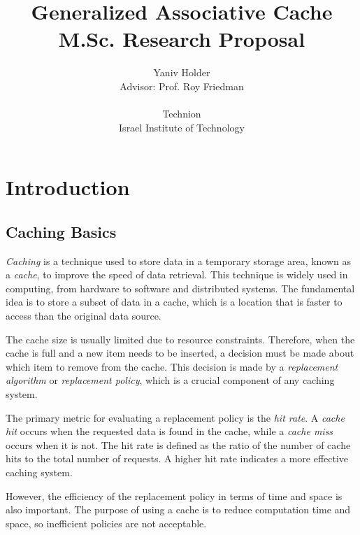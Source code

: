 \documentclass[12pt]{article}
\begin{document}
\title
{
  Generalized Associative Cache  \\
    {\large M.Sc. Research Proposal}
}

\author
{
    Yaniv Holder \\
    Advisor: Prof. Roy Friedman \\ \\
    Technion  \\
    Israel Institute of Technology
}

\maketitle
\pagestyle{plain}

\section{Introduction}

\subsection{Caching Basics}

\textit{Caching} is a technique used to store data in a temporary storage area, known as a \textit{cache}, to improve the speed of data retrieval. This technique is widely used in computing, from hardware to software and distributed systems. The fundamental idea is to store a subset of data in a cache, which is a location that is faster to access than the original data source.

The cache size is usually limited due to resource constraints. Therefore, when the cache is full and a new item needs to be inserted, a decision must be made about which item to remove from the cache. This decision is made by a \textit{replacement algorithm} or \textit{replacement policy}, which is a crucial component of any caching system.

The primary metric for evaluating a replacement policy is the \textit{hit rate}. A \textit{cache hit} occurs when the requested data is found in the cache, while a \textit{cache miss} occurs when it is not. The hit rate is defined as the ratio of the number of cache hits to the total number of requests. A higher hit rate indicates a more effective caching system.

However, the efficiency of the replacement policy in terms of time and space is also important. The purpose of using a cache is to reduce computation time and space, so inefficient policies are not acceptable.
\end{document}

